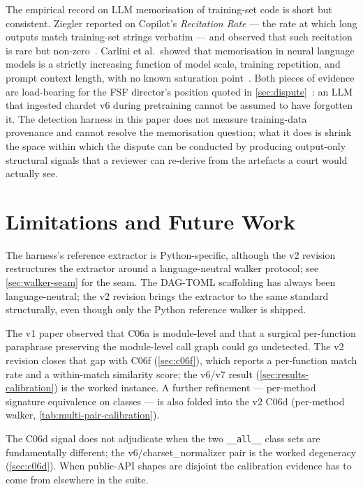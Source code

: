 \documentclass[11pt,letterpaper]{article}
\begin{document}
The empirical record on LLM memorisation of training-set code is
short but consistent. Ziegler reported on Copilot's
\emph{Recitation Rate} --- the rate at which long outputs match
training-set strings verbatim --- and observed that such recitation
is rare but non-zero~\cite{ziegler2021copilot}. Carlini et al.\
showed that memorisation in neural language models is a strictly
increasing function of model scale, training repetition, and prompt
context length, with no known saturation
point~\cite{carlini2023quantifying}. Both pieces of evidence are
load-bearing for the FSF director's position quoted in
\cref{sec:dispute}~\cite{theregister2026chardet}: an LLM that
ingested chardet v6 during pretraining cannot be assumed to have
forgotten it. The detection harness in this paper does not measure
training-data provenance and cannot resolve the memorisation
question; what it does is shrink the space within which the dispute
can be conducted by producing output-only structural signals that a
reviewer can re-derive from the artefacts a court would actually see.

\section{Limitations and Future Work}
\label{sec:limits-future}

The harness's reference extractor is Python-specific, although the
v2 revision restructures the extractor around a language-neutral
walker protocol; see \cref{sec:walker-seam} for the seam. The
DAG-TOML scaffolding has always been language-neutral; the v2
revision brings the extractor to the same standard structurally,
even though only the Python reference walker is shipped.

The v1 paper observed that C06a is module-level and that a
surgical per-function paraphrase preserving the module-level call
graph could go undetected. The v2 revision closes that gap with
C06f (\cref{sec:c06f}), which reports a per-function match rate
and a within-match similarity score; the v6/v7 result
(\cref{sec:results-calibration}) is the worked instance. A
further refinement --- per-method signature equivalence on
classes --- is also folded into the v2 C06d (per-method walker,
\cref{tab:multi-pair-calibration}).

The C06d signal does not adjudicate when the two
\texttt{\_\_all\_\_} class sets are fundamentally different;
the v6/charset\_normalizer pair is the worked degeneracy
(\cref{sec:c06d}). When public-API shapes are disjoint the
calibration evidence has to come from elsewhere in the suite.
\end{document}
